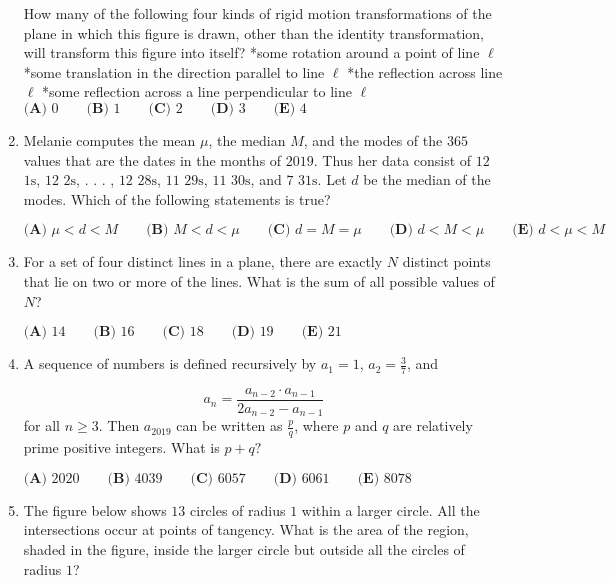 \documentclass{article}
\begin{document}
\begin{enumerate}[label=\arabic*., itemsep=0.5em]
How many of the following four kinds of rigid motion transformations of the plane in which this figure is drawn, other than the identity transformation, will transform this figure into itself?
*some rotation around a point of line $\ell$
*some translation in the direction parallel to line $\ell$
*the reflection across line $\ell$
*some reflection across a line perpendicular to line $\ell$
$\textbf{(A) } 0 \qquad\textbf{(B) } 1 \qquad\textbf{(C) } 2 \qquad\textbf{(D) } 3 \qquad\textbf{(E) } 4$\par \vspace{0.5em}\item Melanie computes the mean $\mu$, the median $M$, and the modes of the $365$ values that are the dates in the months of $2019$. Thus her data consist of $12$ $1\text{s}$, $12$ $2\text{s}$, . . . , $12$ $28\text{s}$, $11$ $29\text{s}$, $11$ $30\text{s}$, and $7$ $31\text{s}$. Let $d$ be the median of the modes. Which of the following statements is true?

$\textbf{(A) } \mu < d < M \qquad\textbf{(B) } M < d < \mu \qquad\textbf{(C) } d = M =\mu \qquad\textbf{(D) } d < M < \mu \qquad\textbf{(E) } d < \mu < M$\par \vspace{0.5em}\item For a set of four distinct lines in a plane, there are exactly $N$ distinct points that lie on two or more of the lines. What is the sum of all possible values of $N$?

$\textbf{(A) } 14 \qquad \textbf{(B) } 16 \qquad \textbf{(C) } 18 \qquad \textbf{(D) } 19 \qquad \textbf{(E) } 21$\par \vspace{0.5em}\item A sequence of numbers is defined recursively by $a_1 = 1$, $a_2 = \frac{3}{7}$, and

\begin{equation*}
a_n=\frac{a_{n-2} \cdot a_{n-1}}{2a_{n-2} - a_{n-1}}
\end{equation*}
for all $n \geq 3$. Then $a_{2019}$ can be written as $\frac{p}{q}$, where $p$ and $q$ are relatively prime positive integers. What is $p+q ?$

$\textbf{(A) } 2020 \qquad\textbf{(B) } 4039 \qquad\textbf{(C) } 6057 \qquad\textbf{(D) } 6061 \qquad\textbf{(E) } 8078$\par \vspace{0.5em}\item The figure below shows $13$ circles of radius $1$ within a larger circle. All the intersections occur at points of tangency. What is the area of the region, shaded in the figure, inside the larger circle but outside all the circles of radius $1$?



\end{enumerate}
\end{document}
